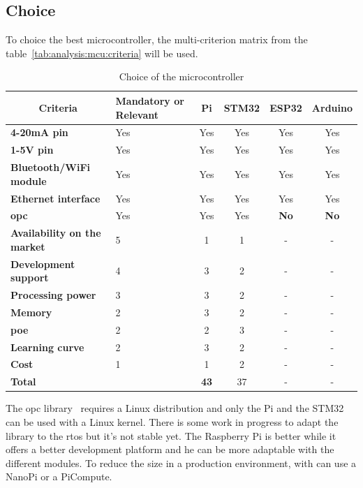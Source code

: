 \newpage
\subsection{Choice}
\label{subsec:choice}
To choice the best microcontroller, the multi-criterion matrix from the table~\ref{tab:analysis:mcu:criteria} will be used.

\begin{table}[ht]
  \centering
  \begin{tabular}{|p{2.6cm}|p{2cm}|c|c|c|c|}
  \hline
  \multicolumn{1}{|c|}{\textbf{Criteria}} &
    \textbf{Mandatory or Relevant} &
    \textbf{Pi} &
    \textbf{STM32} &
    \textbf{ESP32} &
    \textbf{Arduino} \\ \hline
    \textbf{4-20mA pin}                  & Yes & Yes & Yes & Yes & Yes \\ \hline
    \textbf{1-5V pin}                    & Yes & Yes & Yes & Yes & Yes \\ \hline
    \textbf{Bluetooth/WiFi module}       & Yes & Yes & Yes & Yes & Yes \\ \hline
    \textbf{Ethernet interface}          & Yes & Yes & Yes & Yes & Yes \\ \hline
    \textbf{\acrshort{opc}}              & Yes & Yes & Yes & \textbf{No} & \textbf{No} \\ \hline
    \textbf{Availability on the market}  & 5 &   1 & 1 & - & - \\ \hline
    \textbf{Development support}         & 4 &   3 & 2 & - & - \\ \hline
    \textbf{Processing power}            & 3 &   3 & 2 & - & - \\ \hline
    \textbf{Memory}                      & 2 &   3 & 2 & - & - \\ \hline
    \textbf{\acrshort{poe}}              & 2 &   2 & 3 & - & - \\ \hline
    \textbf{Learning curve}              & 2 &   3 & 2 & - & - \\ \hline
    \textbf{Cost}                        & 1 &   1 & 2 & - & - \\ \hline
  \multicolumn{2}{|l|}{\textbf{Total}}    & \textbf{43} & 37 & - & - \\ \hline
  \end{tabular}
  \caption{Choice of the microcontroller}
  \label{tab:analysis:mcu:choice}
\end{table}

The \acrshort{opc} library~\cite{open62541_2023} requires a Linux distribution and only the Pi and the STM32 can be used with a Linux kernel.
There is some work in progress to adapt the library to the \acrshort{rtos} but it's not stable yet.
The Raspberry Pi is better while it offers a better development platform and he can be more adaptable with the different modules.
To reduce the size in a production environment, with can use a NanoPi or a PiCompute.

